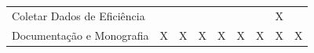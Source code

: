 \documentclass[
	12pt,				%
    oneside,			%
	a4paper,			%
	english,			%
	french,				%
	spanish,			%
	brazil,				%
	]{abntex2}
\begin{document}
\begin{table}[hbt]
{\begin{tabular}{lcccccccc}
	Coletar Dados de Eficiência           &                          &                          &                          &                          &                          &                          & X                        &                          \\
	Documentação e Monografia             & X                        & X                        & X                        & X                        & X                        & X                        & X                        & X                       
	\end{tabular}%
	}
\end{table} 





\end{document}
